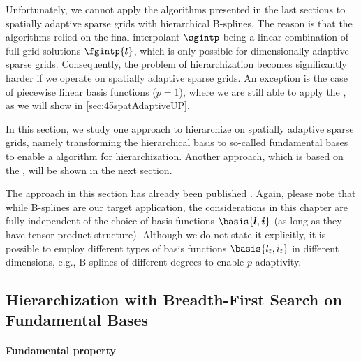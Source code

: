 \label{sec:44spatAdaptiveBFS}

Unfortunately, we cannot apply the algorithms presented in the last
sections to spatially adaptive sparse grids with
hierarchical B-splines.
The reason is that the algorithms relied on the final interpolant $\sgintp$
being a linear combination of full grid solutions $\fgintp{\*l}$,
which is only possible for dimensionally adaptive sparse grids.
Consequently, the problem of hierarchization becomes significantly
harder if we operate on spatially adaptive sparse grids.
An exception is the case of piecewise linear basis functions ($p = 1$),
where we are still able to apply the \up,
as we will show in \cref{sec:45spatAdaptiveUP}.

In this section, we study one approach to hierarchize on
spatially adaptive sparse grids,
namely transforming the hierarchical basis to so-called fundamental bases
to enable a \bfs algorithm for hierarchization.
Another approach, which is based on the \up, will be shown in the next section.

The approach in this section has already been published
\cite{Valentin18Fundamental}.
Again, please note that while B-splines are our target application,
the considerations in this chapter are fully independent of the choice of
basis functions $\basis{\*l,\*i}$ 
(as long as they have tensor product structure).
Although we do not state it explicitly, it is possible to employ
different types of basis functions $\basis{l_t,i_t}$ in different
dimensions, e.g., B-splines of different degrees to enable $p$-adaptivity.



\subsection{Hierarchization with Breadth-First Search on Fundamental Bases}
\label{sec:441BFSFundamentalBases}

\paragraph{Fundamental property}

